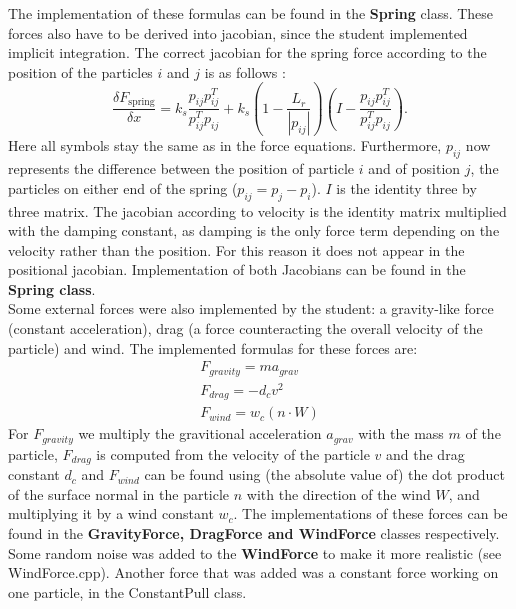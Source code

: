 The implementation of these formulas can be found in the {\bf Spring} class. These forces also have to be derived into jacobian, since the student implemented implicit integration. The correct jacobian for the spring force according to the position of the particles $i$ and $j$ is as follows \citep{choiko}:
\begin{equation}
\frac{\delta F_{\mathrm{spring}}}{\delta x} = k_s \frac{p_{ij}p_{ij}^T}{p_{ij}^Tp_{ij}} + k_s (1 - \frac{L_r}{|p_{ij}|})(I - \frac{p_{ij}p_{ij}^T}{p_{ij}^Tp_{ij}}).
\end{equation}
Here all symbols stay the same as in the force equations. Furthermore, $p_{ij}$ now represents the difference between the position of particle $i$ and of position $j$, the particles on either end of the spring ($p_{ij} = p_j - p_i$). $I$ is the identity three by three matrix. The jacobian according to velocity is the identity matrix multiplied with the damping constant, as damping is the only force term depending on the velocity rather than the position. For this reason it does not appear in the positional jacobian. Implementation of both Jacobians can be found in the {\bf Spring class}.\\

Some external forces were also implemented by the student: a gravity-like force (constant acceleration), drag (a force counteracting the overall velocity of the particle) and wind. The implemented formulas for these forces are:
\begin{equation}
\begin{aligned}
F_{gravity} = m a_{grav}\\
F_{drag} = - d_c v^2\\
F_{wind} =  w_c (n \cdot W)
\end{aligned}
\end{equation}
For $F_{gravity}$ we multiply the gravitional acceleration $a_{grav}$ with the mass $m$ of the particle, $F_{drag}$ is computed from the velocity of the particle $v$ and the drag constant $d_c$ and $F_{wind}$ can be found using (the absolute value of) the dot product of the surface normal in the particle $n$ with the direction of the wind $W$, and multiplying it by a wind constant $w_c$. The implementations of these forces can be found in the {\bf GravityForce, DragForce and WindForce} classes respectively. Some random noise was added to the {\bf WindForce} to make it more realistic (see WindForce.cpp). Another force that was added was a constant force working on one particle, in the ConstantPull class.


\ifx\isEmbedded\undefined


\pagebreak

\fi